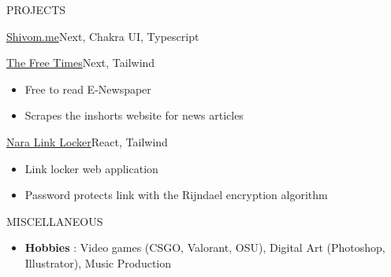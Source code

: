 \documentclass[]{mcdowellcv}
\begin{document}
\begin{cvsection}{PROJECTS}
\begin{cvsubsection}{\href{https://shivom.me}{Shivom.me}}{}{Next, Chakra UI, Typescript}
\begin{itemize}
                    \end{itemize}
		      \end{cvsubsection}
            \begin{cvsubsection}{\href{https://github.com/guchii/the-free-times}{The Free Times}}{}{Next, Tailwind}
                \begin{itemize}
                    \item Free to read E-Newspaper
                    \item Scrapes the inshorts website for news articles
                \end{itemize}
		\end{cvsubsection}
            \begin{cvsubsection}{\href{https://github.com/guchii/nara}{Nara Link Locker}}{}{React, Tailwind}
                \begin{itemize}
                    \item Link locker web application
                    \item Password protects link with the Rijndael encryption algorithm
                \end{itemize}
		\end{cvsubsection}
		
	\end{cvsection}
	
	\begin{cvsection}{MISCELLANEOUS}
		\begin{cvsubsection}{}{}{}	
			\begin{itemize}
				\item {\bf Hobbies} : Video games (CSGO, Valorant, OSU), Digital Art (Photoshop, Illustrator), Music Production
                \end{itemize}
		\end{cvsubsection}
	\end{cvsection}
	
	
\end{document}
